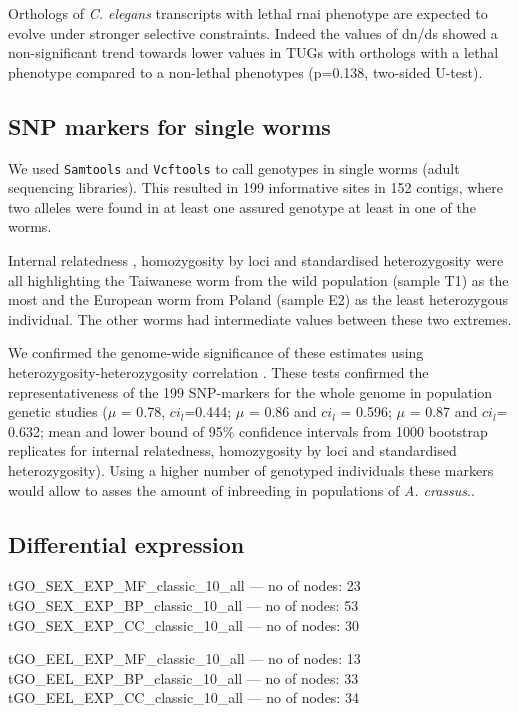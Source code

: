 \documentclass[10pt]{bmc_article}
\newenvironment{bmcformat}{\begin{raggedright}\baselineskip20pt\sloppy\setboolean{publ}{false}}{\end{raggedright}\baselineskip20pt\sloppy}
\begin{document}
\begin{bmcformat}
Orthologs of \textit{C. elegans} transcripts with lethal
rnai phenotype are expected to evolve under stronger selective
constraints. Indeed the values of dn/ds showed a non-significant trend
towards lower values in TUGs with orthologs with a lethal phenotype
compared to a non-lethal phenotypes
(p=0.138, two-sided U-test).

\subsection*{SNP markers for single worms}

We used \texttt{Samtools}\cite{journals/bioinformatics/LiHWFRHMAD09}
and \texttt{Vcftools}\cite{pmid21653522} to call genotypes in single
worms (adult sequencing libraries). This resulted in 199
informative sites in 152 contigs, where two alleles
were found in at least one assured genotype at least in one of the
worms.

Internal relatedness \cite{pmid11571049}, homozygosity by loci
\cite{pmid17107491} and standardised heterozygosity \cite{coltman81j}
were all highlighting the Taiwanese worm from the wild population
(sample T1) as the most and the European worm from Poland (sample E2)
as the least heterozygous individual. The other worms had intermediate
values between these two extremes.

We confirmed the genome-wide significance of these estimates using
heterozygosity-heterozygosity correlation \cite{pmid21565077}. These
tests confirmed the representativeness of the 199
SNP-markers for the whole genome in population genetic studies ($\mu$
= 0.78, $ci_l$=0.444; $\mu$ = 0.86 and $ci_l$ = 0.596; $\mu$ = 0.87
and $ci_l$= 0.632; mean and lower bound of 95\% confidence intervals
from 1000 bootstrap replicates for internal relatedness, homozygosity
by loci and standardised heterozygosity). Using a higher number of
genotyped individuals these markers would allow to asses the amount of
inbreeding in populations of \textit{A. crassus}..

 \subsection*{Differential expression}
                


\begin{Schunk}
\begin{Soutput}
tGO_SEX_EXP_MF_classic_10_all  --- no of nodes:  23 
tGO_SEX_EXP_BP_classic_10_all  --- no of nodes:  53 
tGO_SEX_EXP_CC_classic_10_all  --- no of nodes:  30 
\end{Soutput}
\begin{Soutput}
tGO_EEL_EXP_MF_classic_10_all  --- no of nodes:  13 
tGO_EEL_EXP_BP_classic_10_all  --- no of nodes:  33 
tGO_EEL_EXP_CC_classic_10_all  --- no of nodes:  34 
\end{Soutput}
\end{Schunk}


\end{bmcformat}
\end{document}
